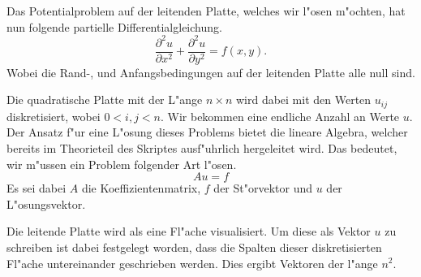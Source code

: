 \begin{refsection}
Das Potentialproblem auf der leitenden Platte, welches wir l"osen
m"ochten, hat nun folgende partielle Differentialgleichung.
\begin{equation}\label{eq:gleichung}
\dfrac{\partial^2 u}{\partial x^2}+\dfrac{\partial^2 u}{\partial y^2} = f(x,y).
\end{equation}
Wobei die Rand-, und Anfangsbedingungen auf der leitenden Platte alle null sind. 
	
Die quadratische Platte mit der L"ange $n\times n$ wird dabei mit
den Werten $u_{ij}$ diskretisiert, wobei $0 < i,j<n$. Wir bekommen
eine endliche Anzahl an Werte $u$.
Der Ansatz f"ur eine L"osung dieses Problems bietet die lineare
Algebra, welcher bereits im Theorieteil des Skriptes ausf"uhrlich
hergeleitet wird. Das bedeutet, wir m"ussen ein Problem folgender
Art l"osen.
\begin{equation}
Au = f
\end{equation}
Es sei dabei $A$ die Koeffizientenmatrix, $f$ der St"orvektor und
$u$ der L"osungsvektor.
	
Die leitende Platte wird als eine Fl"ache visualisiert. Um diese
als Vektor $u$ zu schreiben ist dabei festgelegt worden, dass die
Spalten dieser diskretisierten Fl"ache untereinander geschrieben
werden. Dies ergibt Vektoren der l"ange $n^2$.
	

\end{refsection}
